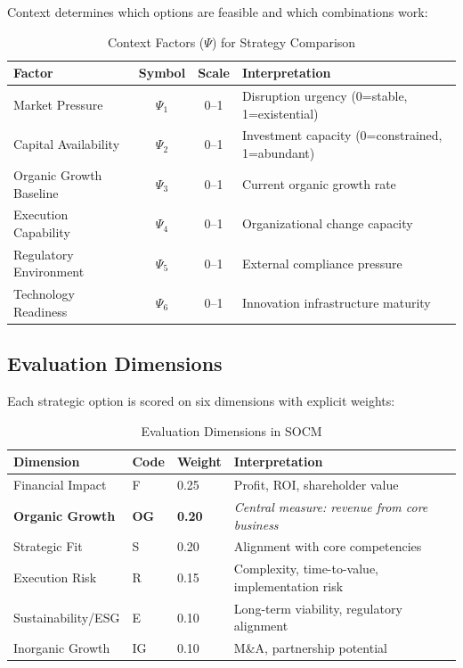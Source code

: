 Context determines which options are feasible and which combinations work:

\begin{table}[htbp]
\centering
\caption{Context Factors ($\Psi$) for Strategy Comparison}
\label{tab:socm-context}
\renewcommand{\arraystretch}{1.4}
\begin{tabular}{@{}lccp{5cm}@{}}
\toprule
\textbf{Factor} & \textbf{Symbol} & \textbf{Scale} & \textbf{Interpretation} \\
\midrule
Market Pressure & $\Psi_1$ & 0--1 & Disruption urgency (0=stable, 1=existential) \\
Capital Availability & $\Psi_2$ & 0--1 & Investment capacity (0=constrained, 1=abundant) \\
Organic Growth Baseline & $\Psi_3$ & 0--1 & Current organic growth rate \\
Execution Capability & $\Psi_4$ & 0--1 & Organizational change capacity \\
Regulatory Environment & $\Psi_5$ & 0--1 & External compliance pressure \\
Technology Readiness & $\Psi_6$ & 0--1 & Innovation infrastructure maturity \\
\bottomrule
\end{tabular}
\end{table}

\subsection{Evaluation Dimensions}
\label{subsec:socm-dimensions}

Each strategic option is scored on six dimensions with explicit weights:

\begin{table}[htbp]
\centering
\caption{Evaluation Dimensions in SOCM}
\label{tab:socm-dimensions}
\renewcommand{\arraystretch}{1.4}
\begin{tabular}{@{}lllp{5cm}@{}}
\toprule
\textbf{Dimension} & \textbf{Code} & \textbf{Weight} & \textbf{Interpretation} \\
\midrule
Financial Impact & F & 0.25 & Profit, ROI, shareholder value \\
\textbf{Organic Growth} & \textbf{OG} & \textbf{0.20} & \textit{Central measure: revenue from core business} \\
Strategic Fit & S & 0.20 & Alignment with core competencies \\
Execution Risk & R & 0.15 & Complexity, time-to-value, implementation risk \\
Sustainability/ESG & E & 0.10 & Long-term viability, regulatory alignment \\
Inorganic Growth & IG & 0.10 & M\&A, partnership potential \\
\bottomrule
\end{tabular}
\end{table}

